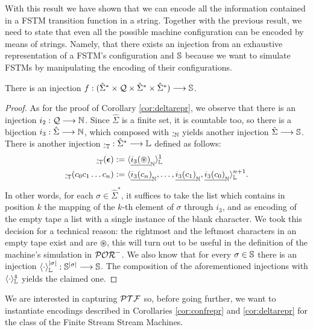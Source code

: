 With this result we have shown that we can encode all the information contained
in a FSTM transition function in a string. Together with the previous result, we need to state
that even all the possible machine configuration can be encoded by means of strings.
Namely, that there exists an injection
from an exhaustive representation of a FSTM's
configuration and $\mathbb{S}$ because we want to simulate
FSTMs by manipulating the encoding of their configurations.


\begin{cor}
  \label{cor:confrepr}
  There is an injection $f: ({\hat \Sigma}^* \times \mathcal{Q} \times {\hat \Sigma}^* \times {\hat \Sigma}^*)
  \longrightarrow  \mathbb{S}$.
\end{cor}
\begin{proof}
  As for the proof of Corollary \ref{cor:deltarepr}, we observe that there is
  an injection $i_2: \mathcal{Q} \longrightarrow \mathbb{N}$.
  Since ${\hat \Sigma}$ is a finite set, it is countable too, so there is a bijection
  $i_3: {\hat \Sigma} \longrightarrow \mathbb{N}$, which composed with ${\underline{\cdot}}_{\mathbb{N}}$
  yields another injection ${\hat \Sigma} \longrightarrow \mathbb{S}$. There is another
  injection $\underline \cdot_{\mathbb{T}}: {\hat \Sigma}^* \longrightarrow \mathbb{L}$ defined as follows:
  \begin{align*}
  \underline \cdot_{\mathbb{T}}(\bm{\epsilon})&:=\langle{{\underline{i_3(\circledast)}}_{\mathbb{N}}}\rangle^{1}_{\mathbb{L}}\\
  \underline \cdot_{\mathbb{T}}(c_0c_1\ldots c_n)&:=\langle{{\underline{i_3(c_n)}}_{\mathbb{N}},\ldots,
  {\underline{i_3(c_1)}}_{\mathbb{N}}, {\underline{i_3(c_0)}}_{\mathbb{N}}}\rangle^{n+1}_{\mathbb{L}}.
  \end{align*}
  In other words,
  for each $\sigma\in {\hat \Sigma}^*$, it suffices to take the list which contains
  in position $k$ the mapping of the $k$-th element of $\sigma$ through
  $i_3$, and as encoding of the empty tape a list with a single instance of
  the blank character. We took this decision for a technical reason:
  the rightmost and the leftmost characters in an empty tape exist and are
  $\circledast$, this will turn out to be useful in the definition of
  the machine's simulation in $\mathcal{POR}^-$. We also know that for every $\sigma \in \mathbb{S}$ there is an injection
  $\langle{\cdot}\rangle^{|\sigma|}_{\mathbb{L}}: \mathbb{S}^{|\sigma|}\longrightarrow \mathbb{S}$.
  The composition of the aforementioned injections with
  $\langle{\cdot}\rangle^{4}_{\mathbb{L}}$ yields the claimed one.
\end{proof}

We are interested in capturing $\mathcal{PTF}$ so, before going further,
we want to instantiate encodings described in
Corollaries \ref{cor:confrepr} and \ref{cor:deltarepr} for the class of the Finite Stream Stream Machines.

